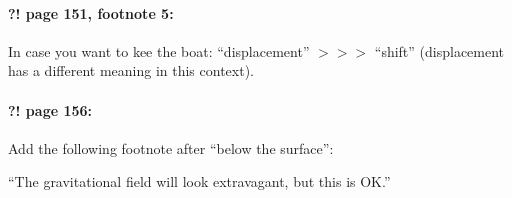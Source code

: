\documentclass[twoside]{article}
\begin{document}
\paragraph{?! page 151, footnote 5:} In case you want to kee the boat: ``displacement'' $>\!>\!>$ ``shift'' (displacement has a different meaning in this context).

\paragraph{?! page 156:} Add the following footnote after ``below the surface'':

``The gravitational field will look extravagant, but this is OK.''
\end{document}
